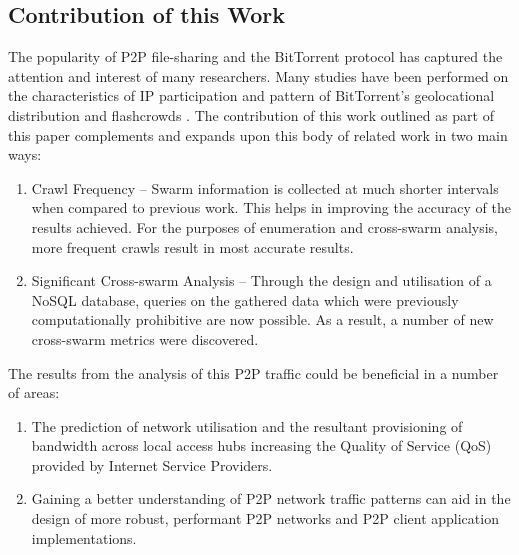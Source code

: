 \documentclass[conference]{IEEEtran}
\begin{document}
\subsection{Contribution of this Work}
\label{contribution}
The popularity of P2P file-sharing and the BitTorrent protocol has captured the attention and interest of many researchers. Many studies have been performed on the characteristics of IP participation and pattern of BitTorrent's geolocational distribution \cite{scanlon,chen,salvador} and flashcrowds \cite{zhang,pouwelse,guo}. The contribution of this work outlined as part of this paper complements and expands upon this body of related work in two main ways: 
\begin{enumerate}
\item Crawl Frequency -- Swarm information is collected at much shorter intervals when compared to previous work. This helps in improving the accuracy of the results achieved. For the purposes of enumeration and cross-swarm analysis, more frequent crawls result in most accurate results.
\item Significant Cross-swarm Analysis -- Through the design and utilisation of a NoSQL database, queries on the gathered data which were previously computationally prohibitive are now possible. As a result, a number of new cross-swarm metrics were discovered.
\end{enumerate}

The results from the analysis of this P2P traffic could be beneficial in a number of areas:
\begin{enumerate}
\item The prediction of network utilisation and the resultant provisioning of bandwidth across local access hubs increasing the Quality of Service (QoS) provided by Internet Service Providers.
\item Gaining a better understanding of P2P network traffic patterns can aid in the design of more robust, performant P2P networks and P2P client application implementations.
\end{enumerate}
\end{document}
